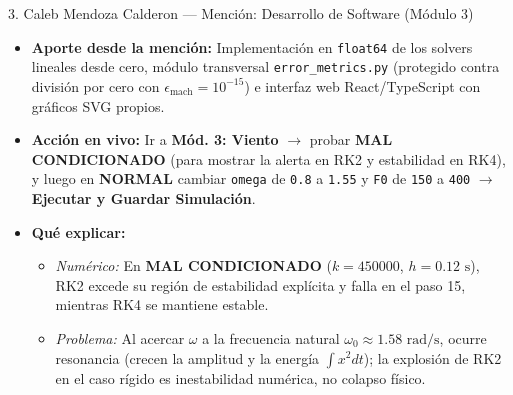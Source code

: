 \documentclass[11pt,a4paper]{article}
\begin{document}
\begin{ficha}{3. Caleb Mendoza Calderon — Mención: Desarrollo de Software (Módulo 3)}
\begin{itemize}[noitemsep]
    \item \textbf{Aporte desde la mención:} Implementación en \texttt{float64} de los solvers lineales desde cero, módulo transversal \texttt{error\_metrics.py} (protegido contra división por cero con $\epsilon_{\text{mach}}=10^{-15}$) e interfaz web React/TypeScript con gráficos SVG propios.
    \item \textbf{Acción en vivo:} Ir a \textbf{Mód. 3: Viento} $\rightarrow$ probar \textbf{MAL CONDICIONADO} (para mostrar la alerta en RK2 y estabilidad en RK4), y luego en \textbf{NORMAL} cambiar \texttt{omega} de \texttt{0.8} a \texttt{1.55} y \texttt{F0} de \texttt{150} a \texttt{400} $\rightarrow$ \textbf{Ejecutar y Guardar Simulación}.
    \item \textbf{Qué explicar:}
    \begin{itemize}[noitemsep]
        \item \textit{Numérico:} En \textbf{MAL CONDICIONADO} ($k=450000$, $h=0.12\text{ s}$), RK2 excede su región de estabilidad explícita y falla en el paso 15, mientras RK4 se mantiene estable.
        \item \textit{Problema:} Al acercar $\omega$ a la frecuencia natural $\omega_0 \approx 1.58\text{ rad/s}$, ocurre resonancia (crecen la amplitud y la energía $\int x^2 dt$); la explosión de RK2 en el caso rígido es inestabilidad numérica, no colapso físico.
    \end{itemize}
\end{itemize}
\end{ficha}
\end{document}
